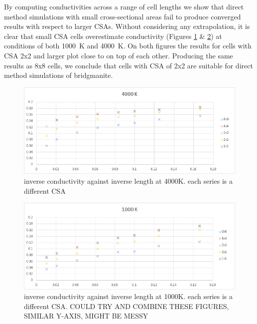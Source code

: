 \documentclass[%
preprint,                                  %
nofootinbib,
 amsmath,amssymb,
 aps,
]{revtex4-1}
\begin{document}
By computing conductivities across a range of cell lengths we show that direct method simulations with small cross-sectional areas fail to produce converged results with respect to larger CSAs. Without considering any extrapolation, it is clear that small CSA cells overestimate conductivity (Figures \ref{fig:direct_length_graph_4000} \& \ref{fig:direct_length_graph_1000}) at conditions of both 1000~K and 4000~K. On both figures the results for cells with CSA 2x2 and larger plot close to on top of each other. Producing the same results as 8x8 cells, we conclude that cells with CSA of 2x2 are suitable for direct method simulations of bridgmanite.

\begin{figure}[h]
  \includegraphics[width=\linewidth]{images/direct_length_graph_4000.png}
  \caption{inverse conductivity against inverse length at 4000K. each series is a different CSA}
  \label{fig:direct_length_graph_4000}
\end{figure}

\begin{figure}[h]
  \includegraphics[width=\linewidth]{images/direct_length_graph_1000.png}
  \caption{inverse conductivity against inverse length at 1000K. each series is a different CSA. COULD TRY AND COMBINE THESE FIGURES, SIMILAR Y-AXIS, MIGHT BE MESSY}
  \label{fig:direct_length_graph_1000}
\end{figure}
\end{document}
